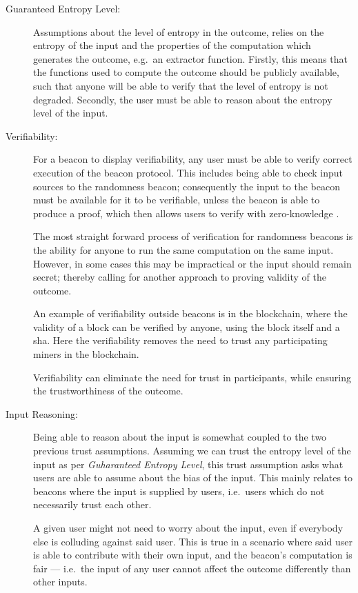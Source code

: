 \begin{description}

    \item [Guaranteed Entropy Level:]
        Assumptions about the level of entropy in the outcome, relies on the entropy of the input and the properties of the computation which generates the outcome, e.g.\ an extractor function.
        Firstly, this means that the functions used to compute the outcome should be publicly available, such that anyone will be able to verify that the level of entropy is not degraded.
        Secondly, the user must be able to reason about the entropy level of the input.

    \item [Verifiability:]
        For a beacon to display verifiability, any user must be able to verify correct execution of the beacon protocol.
        This includes being able to check input sources to the randomness beacon;
        consequently the input to the beacon must be available for it to be verifiable, unless the beacon is able to produce a proof, which then allows users to verify with zero-knowledge .

        The most straight forward process of verification for randomness beacons is the ability for anyone to run the same computation on the same input.
        However, in some cases this may be impractical or the input should remain secret; thereby calling for another approach to proving validity of the outcome.

        An example of verifiability outside beacons is in the blockchain, where the validity of a block can be verified by anyone, using the block itself and a \acrfull{sha}.
        Here the verifiability removes the need to trust any participating miners in the blockchain.

        Verifiability can eliminate the need for trust in participants, while ensuring the trustworthiness of the outcome.

    \item [Input Reasoning:]
        Being able to reason about the input is somewhat coupled to the two previous trust assumptions.
        Assuming we can trust the entropy level of the input as per \emph{Guharanteed Entropy Level}, this trust assumption asks what users are able to assume about the bias of the input.
        This mainly relates to beacons where the input is supplied by users, i.e.\ users which do not necessarily trust each other.

        A given user might not need to worry about the input, even if everybody else is colluding against said user.
        This is true in a scenario where said user is able to contribute with their own input, and the beacon's computation is fair
        --- i.e.\ the input of any user cannot affect the outcome differently than other inputs.

\end{description}

